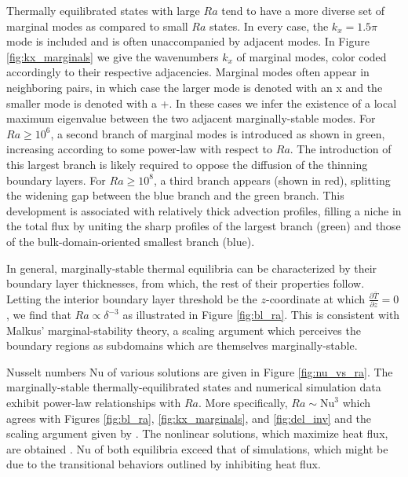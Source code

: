 \documentclass[reprint,amsmath,amssymb,aps]{revtex4-1}
\newcommand\Nu{\mathrm{Nu}}
\begin{document}
Thermally equilibrated states with large $Ra$ tend to have a more diverse set of marginal modes as compared to small $Ra$ states. In every case, the $k_x = 1.5\pi$ mode is included and is often unaccompanied by adjacent modes. In Figure \ref{fig:kx_marginals} we give the wavenumbers $k_x$ of marginal modes, color coded accordingly to their respective adjacencies. Marginal modes often appear in neighboring pairs, in which case the larger mode is denoted with an x and the smaller mode is denoted with a +. In these cases we infer the existence of a local maximum eigenvalue between the two adjacent marginally-stable modes. For $Ra \geq 10^6$, a second branch of marginal modes is introduced as shown in green, increasing according to some power-law with respect to $Ra$. The introduction of this largest branch is likely required to oppose the diffusion of the thinning boundary layers. For $Ra \geq 10^8$, a third branch appears (shown in red), splitting the widening gap between the blue branch and the green branch. This development is associated with relatively thick advection profiles, filling a niche in the total flux by uniting the sharp profiles of the largest branch (green) and those of the bulk-domain-oriented smallest branch (blue).

\par In general, marginally-stable thermal equilibria can be characterized by their boundary layer thicknesses, from which, the rest of their properties follow. Letting the interior boundary layer threshold be the $z$-coordinate at which $\frac{\partial \bar{T}}{\partial z} = 0$, we find that $Ra \propto  \delta^{-3}$ as illustrated in Figure \ref{fig:bl_ra}. This is consistent with Malkus' marginal-stability theory, a scaling argument which perceives the boundary regions as subdomains which are themselves marginally-stable.

Nusselt numbers $\Nu$ of various solutions are given in Figure \ref{fig:nu_vs_ra}. The marginally-stable thermally-equilibrated states and numerical simulation data exhibit power-law relationships with $Ra$. More specifically, $Ra \sim \Nu^3$ which agrees with Figures \ref{fig:bl_ra}, \ref{fig:kx_marginals}, and \ref{fig:del_inv} and the scaling argument given by \cite{Malkus}. The nonlinear solutions, which maximize heat flux, are obtained \cite{Waleffe}. $\Nu$ of both equilibria exceed that of simulations, which might be due to the transitional behaviors outlined by \cite{Yalniz} inhibiting heat flux.
\end{document}
